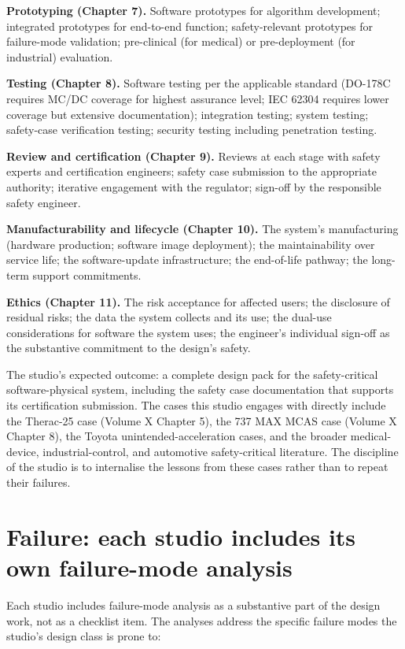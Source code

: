 \textbf{Prototyping (Chapter 7).} Software prototypes for algorithm development; integrated prototypes for end-to-end function; safety-relevant prototypes for failure-mode validation; pre-clinical (for medical) or pre-deployment (for industrial) evaluation.

\textbf{Testing (Chapter 8).} Software testing per the applicable standard (DO-178C requires MC/DC coverage for highest assurance level; IEC 62304 requires lower coverage but extensive documentation); integration testing; system testing; safety-case verification testing; security testing including penetration testing.

\textbf{Review and certification (Chapter 9).} Reviews at each stage with safety experts and certification engineers; safety case submission to the appropriate authority; iterative engagement with the regulator; sign-off by the responsible safety engineer.

\textbf{Manufacturability and lifecycle (Chapter 10).} The system's manufacturing (hardware production; software image deployment); the maintainability over service life; the software-update infrastructure; the end-of-life pathway; the long-term support commitments.

\textbf{Ethics (Chapter 11).} The risk acceptance for affected users; the disclosure of residual risks; the data the system collects and its use; the dual-use considerations for software the system uses; the engineer's individual sign-off as the substantive commitment to the design's safety.

The studio's expected outcome: a complete design pack for the safety-critical software-physical system, including the safety case documentation that supports its certification submission. The cases this studio engages with directly include the Therac-25 case (Volume X Chapter 5), the 737 MAX MCAS case (Volume X Chapter 8), the Toyota unintended-acceleration cases, and the broader medical-device, industrial-control, and automotive safety-critical literature. The discipline of the studio is to internalise the lessons from these cases rather than to repeat their failures.

\section{Failure: each studio includes its own failure-mode analysis}

Each studio includes failure-mode analysis as a substantive part of the design work, not as a checklist item. The analyses address the specific failure modes the studio's design class is prone to:

